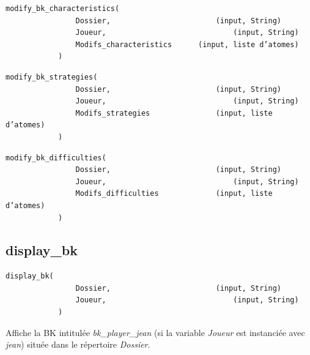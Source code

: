 \documentclass[a4paper,12pt]{article}
\begin{document}
\begin{Verbatim}
modify_bk_characteristics(
				Dossier, 						(input, String)
				Joueur, 							(input, String)
				Modifs_characteristics 		(input, liste d’atomes)
			)
\end{Verbatim}



\begin{Verbatim}
modify_bk_strategies(
				Dossier, 						(input, String)
				Joueur, 							(input, String)
				Modifs_strategies				(input, liste d’atomes)
			)
\end{Verbatim}

\begin{Verbatim}
modify_bk_difficulties(
				Dossier, 						(input, String)
				Joueur, 							(input, String)
				Modifs_difficulties 			(input, liste d’atomes)
			)
\end{Verbatim}


\subsection{display\_bk}

\begin{Verbatim}
display_bk(
				Dossier, 						(input, String)
				Joueur, 							(input, String)
			)
\end{Verbatim}

Affiche la BK intitulée \emph{bk\_player\_jean} (si la variable \emph{Joueur} est instanciée avec \emph{jean}) située dans le répertoire \emph{Dossier}.
\end{document}
